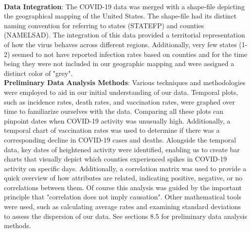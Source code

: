 \documentclass[sigconf,screen,nonacm]{acmart}
\begin{document}
\\
\textbf{Data Integration}: The COVID-19 data was merged with a shape-file depicting the geographical mapping of the United States. The shape-file had its distinct naming convention for referring to states (STATEFP) and counties (NAMELSAD). The integration of this data provided a territorial representation of how the virus behaves across different regions. Additionally, very few states (1-2) seemed to not have reported infection rates based on counties and for the time being they were not included in our geographic mapping and were assigned a distinct color of "grey".\\


\noindent
\textbf{Preliminary Data Analysis Methods}: Various techniques and methodologies were employed to aid in our initial understanding of our data. Temporal plots, such as incidence rates, death rates, and vaccination rates, were graphed over time to familiarize ourselves with the data. Comparing all these plots can pinpoint dates when COVID-19 activity was unusually high. Additionally, a temporal chart of vaccination rates was used to determine if there was a corresponding decline in COVID-19 cases and deaths. Alongside the temporal data, key dates of heightened activity were identified, enabling us to create bar charts that visually depict which counties experienced spikes in COVID-19 activity on specific days. Additionally, a correlation matrix was used to provide a quick overview of how attributes are related, indicating positive, negative, or no correlations between them. Of course this analysis was guided by the important principle that "correlation does not imply causation". Other mathematical tools were used, such as calculating average rates and examining standard deviations to assess the dispersion of our data. See sections 8.5 for preliminary data analysis methods.  \\
\end{document}
